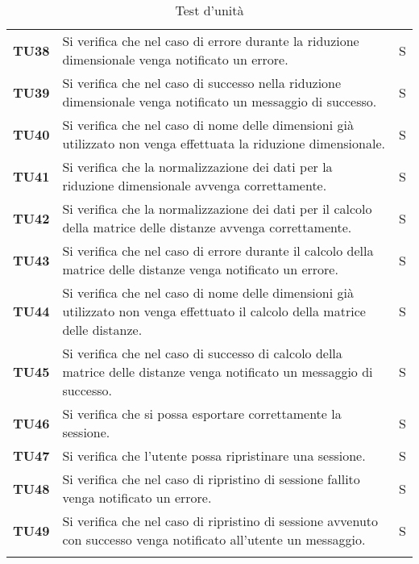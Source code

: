 {\begin{longtable}{ C{1.5cm} | C{12cm}| C{1.5cm} }
\textbf{TU38} & 
Si verifica che nel caso di errore durante la riduzione dimensionale venga notificato un errore. & 
S\\

\textbf{TU39} & 
Si verifica che nel caso di successo nella riduzione dimensionale venga notificato un messaggio di successo. & 
S\\

\textbf{TU40} & 
Si verifica che nel caso di nome delle dimensioni già utilizzato non venga effettuata la riduzione dimensionale. & 
S\\

\textbf{TU41} & 
Si verifica che la normalizzazione dei dati per la riduzione dimensionale avvenga correttamente. & 
S\\

\textbf{TU42} & 
Si verifica che la normalizzazione dei dati per il calcolo della matrice delle distanze avvenga correttamente. & 
S\\

\textbf{TU43} & 
Si verifica che nel caso di errore durante il calcolo della matrice delle distanze venga notificato un errore. & 
S\\

\textbf{TU44} & 
Si verifica che nel caso di nome delle dimensioni già utilizzato non venga effettuato il calcolo della matrice delle distanze. & 
S\\

\textbf{TU45} & 
Si verifica che nel caso di successo di calcolo della matrice delle distanze venga notificato un messaggio di successo. & 
S\\

\textbf{TU46} & 
Si verifica che si possa esportare correttamente la sessione. & 
S\\

\textbf{TU47} & 
Si verifica che l'utente possa ripristinare una sessione. & 
S\\

\textbf{TU48} & 
Si verifica che nel caso di ripristino di sessione fallito venga notificato un errore. & 
S\\ 
 
\textbf{TU49} & 
Si verifica che nel caso di ripristino di sessione avvenuto con successo venga notificato all'utente un messaggio. & 
S\\ 
 
\caption{Test d'unità}
\label{testIntegrazione}
\end{longtable}
}

